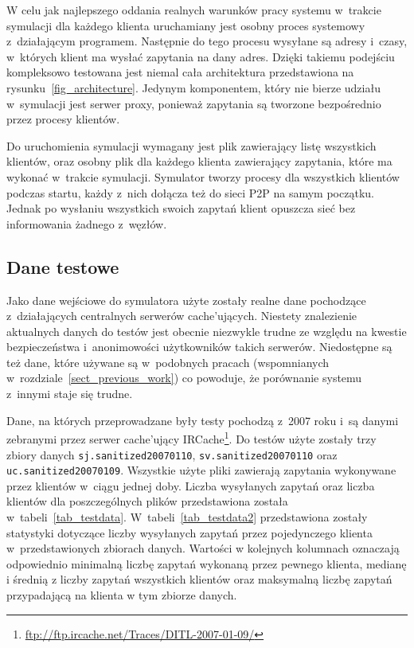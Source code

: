 \documentclass[a4paper,11pt]{scrartcl}
\newcommand{\f}{\texttt}
\newcommand{\s}{ }
\newcommand{\keszujacy}{cache'ujący}
\newcommand{\keszujacych}{cache'ujących}
\begin{document}
W celu jak najlepszego oddania realnych warunków pracy systemu w~trakcie symulacji dla każdego klienta uruchamiany jest osobny proces systemowy z~działającym programem. Następnie do tego procesu wysyłane są adresy i~czasy, w~których klient ma wysłać zapytania na dany adres. Dzięki takiemu podejściu kompleksowo testowana jest niemal cała architektura przedstawiona na rysunku~\ref{fig_architecture}. Jedynym komponentem, który nie bierze udziału w~symulacji jest serwer proxy, ponieważ zapytania są tworzone bezpośrednio przez procesy klientów.

Do uruchomienia symulacji wymagany jest plik zawierający listę wszystkich klientów, oraz osobny plik dla każdego klienta zawierający zapytania, które ma wykonać w~trakcie symulacji. Symulator tworzy procesy dla wszystkich klientów podczas startu, każdy z~nich dołącza też do sieci P2P na samym początku. Jednak po wysłaniu wszystkich swoich zapytań klient opuszcza sieć bez informowania żadnego z~węzłów.

\subsection{Dane testowe}
Jako dane wejściowe do symulatora użyte zostały realne dane pochodzące z~działających centralnych serwerów \keszujacych. Niestety znalezienie aktualnych danych do testów jest obecnie niezwykle trudne ze względu na kwestie bezpieczeństwa i~anonimowości użytkowników takich serwerów. Niedostępne są też dane, które używane są w~podobnych pracach (wspomnianych w~rozdziale~\ref{sect_previous_work}) co powoduje, że porównanie systemu z~innymi staje się trudne. 

Dane, na których przeprowadzane były testy pochodzą z~2007 roku i~są danymi zebranymi przez serwer \keszujacy\s IRCache\footnote{\url{ftp://ftp.ircache.net/Traces/DITL-2007-01-09/}}. Do testów użyte zostały trzy zbiory danych \f{sj.sanitized20070110}, \f{sv.sanitized20070110} oraz \f{uc.sanitized20070109}.
Wszystkie użyte pliki zawierają zapytania wykonywane przez klientów w~ciągu jednej doby. Liczba wysyłanych zapytań oraz liczba klientów dla poszczególnych plików przedstawiona została w~tabeli~\ref{tab_testdata}. W~tabeli~\ref{tab_testdata2} przedstawiona zostały statystyki dotyczące liczby wysyłanych zapytań przez pojedynczego klienta w~przedstawionych zbiorach danych. Wartości w kolejnych kolumnach oznaczają odpowiednio minimalną liczbę zapytań wykonaną przez pewnego klienta, medianę i średnią z liczby zapytań wszystkich klientów oraz maksymalną liczbę zapytań przypadającą na klienta w tym zbiorze danych.
\end{document}
